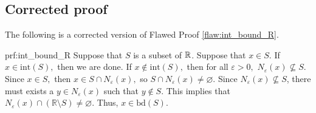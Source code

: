 \clearpage
\subsection{Corrected proof}

The following is a corrected version of Flawed Proof \ref{flaw:int_bound_R}. %

\begin{prf}{prf:int_bound_R} %
Suppose that $S$ is a subset of $\mathbb R$.
Suppose that $x \in S.$ If $x \in \text{int}(S),$ then we are done. If $x \notin \text{int}(S),$ then for all $\varepsilon > 0,$ $N_{\varepsilon}(x) \not\subseteq S.$ Since $x \in S,$ then $x \in S \cap N_{\varepsilon}(x),$ so $S \cap N_{\varepsilon}(x) \neq \varnothing.$ Since $ N_{\varepsilon}(x) \not\subseteq S$, there must exists a $y \in N_{\varepsilon}(x)$ such that $y\not\in S.$ This implies that $N_{\varepsilon}(x) \cap (\mathbb{R} \setminus S) \neq \varnothing.$ Thus, $x \in \text{bd}(S)$.
\end{prf}
